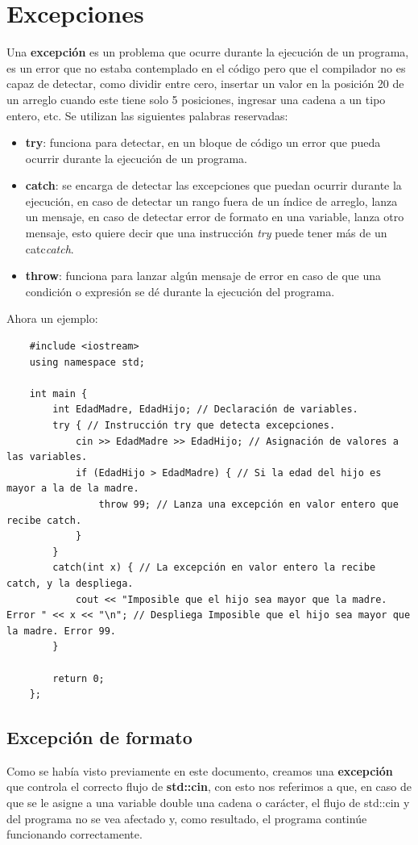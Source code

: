 \section{Excepciones}
\hspace{0.55cm}Una \textbf{excepción} es un problema que ocurre durante la ejecución de un programa, es un error que no estaba contemplado en el código pero que el compilador no es capaz de detectar, como dividir entre cero, insertar un valor en la posición 20 de un arreglo cuando este tiene solo 5 posiciones, ingresar una cadena a un tipo entero, etc. Se utilizan las siguientes palabras reservadas:
\begin{itemize}
    \item \textbf{try}: funciona para detectar, en un bloque de código un error que pueda ocurrir durante la ejecución de un programa.
    \item \textbf{catch}: se encarga de detectar las excepciones que puedan ocurrir durante la ejecución, en caso de detectar un rango fuera de un índice de arreglo, lanza un mensaje, en caso de detectar error de formato en una variable, lanza otro mensaje, esto quiere decir que una instrucción \textit{try} puede tener más de un catc\textit{catch}.
    \item \textbf{throw}: funciona para lanzar algún mensaje de error en caso de que una condición o expresión se dé durante la ejecución del programa.
\end{itemize}

Ahora un ejemplo:
\begin{lstlisting}
    #include <iostream>
    using namespace std;
    
    int main {
        int EdadMadre, EdadHijo; // Declaración de variables.
        try { // Instrucción try que detecta excepciones.
            cin >> EdadMadre >> EdadHijo; // Asignación de valores a las variables.
            if (EdadHijo > EdadMadre) { // Si la edad del hijo es mayor a la de la madre.
                throw 99; // Lanza una excepción en valor entero que recibe catch.
            }
        }
        catch(int x) { // La excepción en valor entero la recibe catch, y la despliega.
            cout << "Imposible que el hijo sea mayor que la madre. Error " << x << "\n"; // Despliega Imposible que el hijo sea mayor que la madre. Error 99.
        }
        
        return 0;
    };
\end{lstlisting}


\subsection{Excepción de formato}
\hspace{0.55cm}Como se había visto previamente en este documento, creamos una \textbf{excepción} que controla el correcto flujo de \textbf{std::cin}, con esto nos referimos a que, en caso de que se le asigne a una variable double una cadena o carácter, el flujo de std::cin y del programa no se vea afectado y, como resultado, el programa continúe funcionando correctamente.

